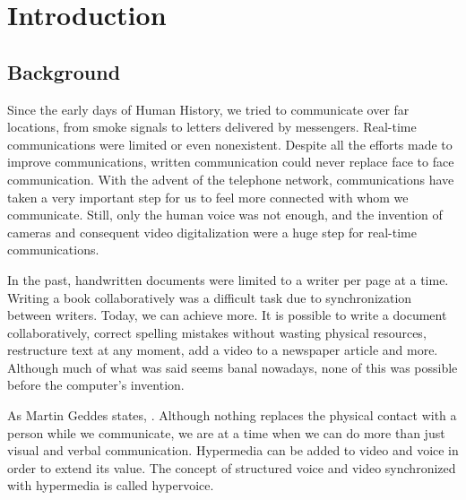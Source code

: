 \chapter{Introduction}
\label{chapter:introduction}

\section{Background}
\label{section:background}

	Since the early days of Human History, we tried to communicate over far locations, from smoke signals to letters delivered by messengers. Real-time communications were limited or even nonexistent. Despite all the efforts made to improve communications, written communication could never replace face to face communication.
	With the advent of the telephone network, communications have taken a very important step for us to feel more connected with whom we communicate. Still, only the human voice was not enough, and the invention of cameras and consequent video digitalization were a huge step for real-time communications.

	In the past, handwritten documents were limited to a writer per page at a time. Writing a book collaboratively was a difficult task due to synchronization between writers.
	Today, we can achieve more. It is possible to write a document collaboratively, correct spelling mistakes without wasting physical resources, restructure text at any moment, add a video to a newspaper article and more. Although much of what was said seems banal nowadays, none of this was possible before the computer's invention. 

	As Martin Geddes states\cite{geddes}, . Although nothing replaces the physical contact with a person while we communicate, we are at a time when we can do more than just visual and verbal communication. Hypermedia can be added to video and voice in order to extend its value. The concept of structured voice and video synchronized with hypermedia is called hypervoice\cite{geddes}.

